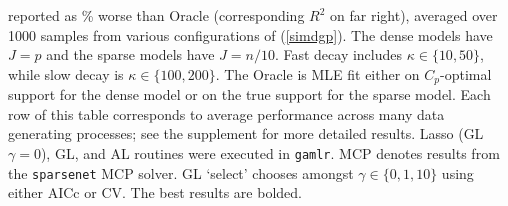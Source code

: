 \documentclass[12pt]{article}
\begin{document}
\begin{table}
{reported as  \% worse than Oracle (corresponding $R^2$ on far right),
averaged over 1000  samples from various configurations of (\ref{simdgp}).
The dense models have $J=p$ and the sparse models have $J=n/10$.  Fast decay includes $\kappa \in \{10,50\}$, while slow decay is $\kappa \in
\{100,200\}$.
The Oracle is MLE fit either on  $C_p$-optimal support for the dense model or
on the true support for the sparse model. Each row of this table corresponds to average
performance across many data generating processes; see the supplement for more
detailed results.  Lasso (GL $\gamma=0$), GL, and AL routines were executed
in {\tt gamlr}.  MCP denotes results from the {\tt sparsenet} MCP solver. GL
`select' chooses amongst $\gamma \in \{0,1,10\}$ using either AICc or CV.
The best results are bolded.}
\end{table}
\end{document}

